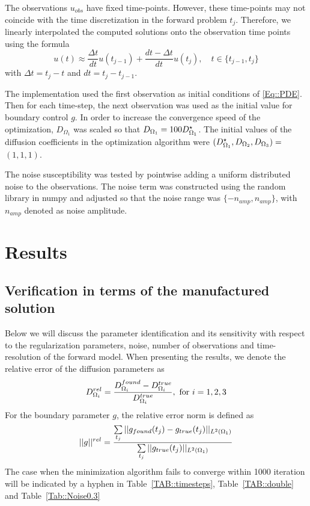 \documentclass[11pt,a4paper]{article}
\begin{document}
The observations $u_{obs}$ have fixed time-points. However, these time-points may not coincide  with the time discretization in the forward problem $t_j$. Therefore, we linearly interpolated the computed solutions onto the observation time points using the formula
\begin{equation}
\label{observation:interpolation}
u(t) \approx \frac{\Delta t}{dt} u(t_{j-1}) + \frac{dt - \Delta t }{dt} u(t_{j}), \quad t \in \lbrace t_{j-1}, t_j \rbrace
\end{equation}
with $\Delta t = t_j-t$ and $dt = t_j - t_{j-1}$.

The implementation used the first observation as initial conditions of \eqref{Eq::PDE}. Then for each time-step, the next observation was used as the initial value for boundary control $g$. In order to increase the convergence speed of the optimization, $D_{\Omega_1}$ was scaled so that $D_{\Omega_1} = 100 D_{\Omega_1}\sp{\star} $. The initial values of the diffusion coefficients in the optimization algorithm were $(D_{\Omega_1}\sp{\star}, D_{\Omega_2}, D_{\Omega_3})=$  $(1, 1, 1)$. 

The noise susceptibility was tested by pointwise adding a uniform distributed noise to the observations. The noise term was constructed using the random library in numpy and adjusted so that the noise range was $\lbrace -n_{amp} , n_{amp} \rbrace $, with $n_{amp}$ denoted as noise amplitude.


\section{Results}

\subsection{Verification in terms of the manufactured solution}
Below we will discuss the parameter identification and its sensitivity with respect to the regularization parameters, noise, number of observations and time-resolution of the forward model. When presenting the results, we denote the relative error of the diffusion parameters as 
\begin{equation}
 D_{\Omega_i}\sp{rel} = \frac{D_{\Omega_i}\sp{found} -D_{\Omega_i}\sp{true} }{D_{\Omega_i}\sp{true} }, \text{ for } i=1,2,3
\end{equation}
For the boundary parameter $g$, the relative error norm is defined as 
\begin{equation}
|| g ||\sp{rel} = \frac{ \sum\limits_{t_j} || g_{found}(t_j) -g_{true}(t_j)||_{L^2(\Omega_1)} }{  \sum\limits_{t_j}||g_{true}(t_j)||_{L^2(\Omega_1)} }
\end{equation}
The case when the minimization algorithm fails to converge within 1000 iteration will be indicated by a hyphen in Table~\ref{TAB::timesteps}, Table~\ref{TAB::double} and Table~\ref{Tab::Noise0.3}
\end{document}
